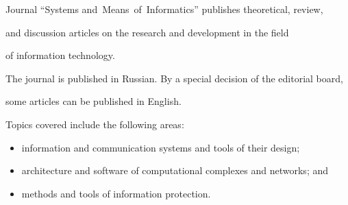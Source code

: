 {\small


{ %

















\noindent


Journal ``Systems and~Means~of~Informatics'' publishes theoretical, review,


and discussion articles on the research and development in the field


of information technology.





The journal is published in Russian. By a special decision of the editorial board,


some articles can be published in English.





\def\leftfootline{\ }


\def\rightfootline{\ }





Topics covered include the following areas:


\begin{itemize}


\item   information and communication systems and tools of their design;\\[-14pt]


\item   architecture and software of computational complexes and networks; and\\[-14pt]


\item   methods and tools of  information protection.\\[-16pt]


\end{itemize}





}}
